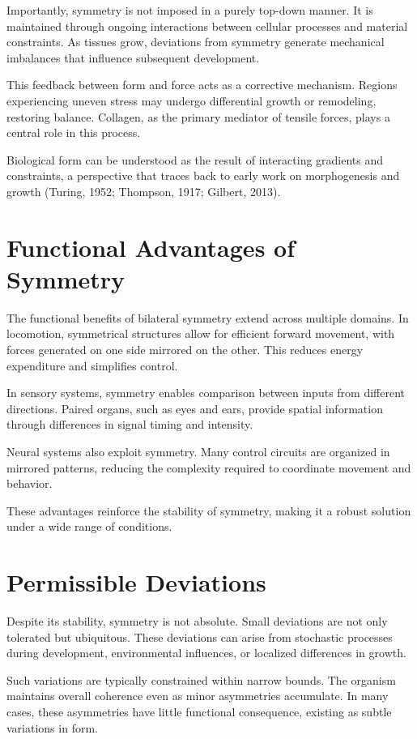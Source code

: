 \documentclass[11pt,oneside]{book}
\begin{document}
Importantly, symmetry is not imposed in a purely top-down manner. It is maintained through ongoing interactions between cellular processes and material constraints. As tissues grow, deviations from symmetry generate mechanical imbalances that influence subsequent development.

This feedback between form and force acts as a corrective mechanism. Regions experiencing uneven stress may undergo differential growth or remodeling, restoring balance. Collagen, as the primary mediator of tensile forces, plays a central role in this process.

Biological form can be understood as the result of interacting gradients and constraints, a perspective that traces back to early work on morphogenesis and growth (Turing, 1952; Thompson, 1917; Gilbert, 2013).

\section{Functional Advantages of Symmetry}

The functional benefits of bilateral symmetry extend across multiple domains. In locomotion, symmetrical structures allow for efficient forward movement, with forces generated on one side mirrored on the other. This reduces energy expenditure and simplifies control.

In sensory systems, symmetry enables comparison between inputs from different directions. Paired organs, such as eyes and ears, provide spatial information through differences in signal timing and intensity.

Neural systems also exploit symmetry. Many control circuits are organized in mirrored patterns, reducing the complexity required to coordinate movement and behavior.

These advantages reinforce the stability of symmetry, making it a robust solution under a wide range of conditions.

\section{Permissible Deviations}

Despite its stability, symmetry is not absolute. Small deviations are not only tolerated but ubiquitous. These deviations can arise from stochastic processes during development, environmental influences, or localized differences in growth.

Such variations are typically constrained within narrow bounds. The organism maintains overall coherence even as minor asymmetries accumulate. In many cases, these asymmetries have little functional consequence, existing as subtle variations in form.
\end{document}
